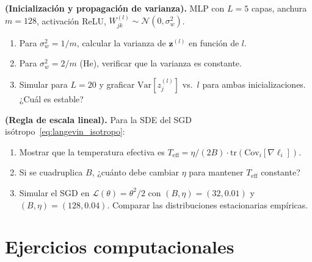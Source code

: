 \begin{ejercicio}
\textbf{(Inicialización y propagación de varianza).}
MLP con $L = 5$ capas, anchura $m = 128$, activación ReLU,
$W_{jk}^{(l)} \sim \mathcal{N}(0,\sigma_w^2)$.
\begin{enumerate}[label=(\alph*)]
  \item Para $\sigma_w^2 = 1/m$, calcular la varianza de
        $\bm{z}^{(l)}$ en función de $l$.
  \item Para $\sigma_w^2 = 2/m$ (He), verificar que la varianza es
        constante.
  \item Simular para $L = 20$ y graficar
        $\text{Var}[z_j^{(l)}]$ vs.\ $l$ para ambas
        inicializaciones. ¿Cuál es estable?
\end{enumerate}
\end{ejercicio}

\begin{ejercicio}
\textbf{(Regla de escala lineal).}
Para la SDE del SGD isótropo~\eqref{eq:langevin_isotropo}:
\begin{enumerate}[label=(\alph*)]
  \item Mostrar que la temperatura efectiva es
        $T_{\text{eff}} = \eta/(2B) \cdot
        \text{tr}(\text{Cov}_i[\nabla\ell_i])$.
  \item Si se cuadruplica $B$, ¿cuánto debe cambiar $\eta$ para
        mantener $T_{\text{eff}}$ constante?
  \item Simular el SGD en $\mathcal{L}(\theta) = \theta^2/2$ con
        $(B, \eta) = (32, 0.01)$ y $(B, \eta) = (128, 0.04)$.
        Comparar las distribuciones estacionarias empíricas.
\end{enumerate}
\end{ejercicio}

\section*{Ejercicios computacionales}

